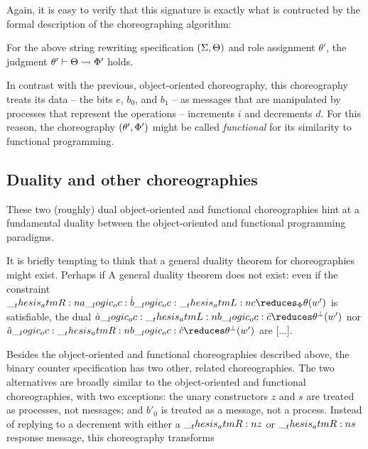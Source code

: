Again, it is easy to verify that this signature is exactly what is contructed by the formal description of the choreographing algorithm:
\begin{proposition}
  For the above string rewriting specification $(\Sigma, \Theta)$ and role assignment $\theta'$, the judgment $\theta' \vdash \Theta \rightsquigarrow \Phi'$ holds.
\end{proposition}

In contrast with the previous, object-oriented choreography, this choreography treats its data -- the bits $e$, $b_0$, and $b_1$ -- as messages that are manipulated by processes that represent the operations -- increments $i$ and decrements $d$.
For this reason, the choreography $(\theta', \Phi')$ might be called \emph{functional} for its similarity to functional programming.


\subsection{Duality and other choreographies}

These two (roughly) dual object-oriented and functional choreographies hint at a fundamental duality between the object-oriented and functional programming paradigms.

It is briefly tempting to think that a general duality theorem for choreographies might exist.
Perhaps if 
A general duality theorem does not exist: even if the constraint $\atmR{a} \oc \defp{b} \oc \atmL{c} \reduces_{\orsig} \theta(w')$ is satisfiable, the dual $\defp{a} \oc \atmL{b} \oc \defp{c} \reduces \theta^{\bot}(w')$ nor $\defp{a} \oc \atmR{b} \oc \defp{c} \reduces \theta^{\bot}(w')$ are [...].


Besides the object-oriented and functional choreographies described above, the binary counter specification has two other, related choreographies.
The two alternatives are broadly similar to the object-oriented and functional choreographies, with two exceptions: the unary constructors $z$ and $s$ are treated as processes, not messages; and $b'_0$ is treated as a message, not a process.
Instead of replying to a decrement with either a $\__thesis_atmR:n {z}$ or $\__thesis_atmR:n {s}$ response message, this choreography transforms

